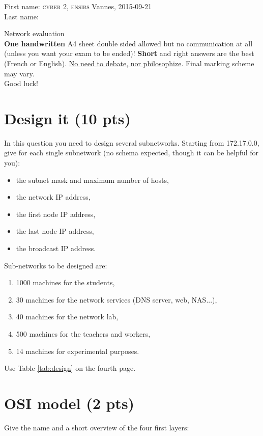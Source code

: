 \documentclass[11pt]{article}
\begin{document}
\noindent First name: \hfill {\scshape cyber} 2, {\scshape ensibs} Vannes, 2015-09-21 \\
Last name:
\begin{center}
	{\LARGE{Network evaluation}} \\ \vspace{10pt}
	\textbf{One handwritten} A4 sheet double sided allowed but no communication at all (unless you want your exam to be ended)!
	\textbf{Short} and right answers are the best (French or English). \underline{No need to debate, nor philosophize}. Final marking scheme may vary. \\
	Good luck!
\end{center}

\section{Design it (10 pts)}
	In this question you need to design several subnetworks. Starting from 172.17.0.0, give for each single subnetwork (no schema expected, though it can be helpful for you):
	\begin{itemize}
		\item the subnet mask and maximum number of hosts,
		\item the network IP address,
		\item the first node IP address,
		\item the last node IP address,
		\item the broadcast IP address.
	\end{itemize}
	Sub-networks to be designed are:
	\begin{enumerate}
		\item 1000 machines for the students,
		\item 30 machines for the network services (DNS server, web, NAS...),
		\item 40 machines for the network lab,
		\item 500 machines for the teachers and workers,
		\item 14 machines for experimental purposes.
	\end{enumerate}
Use Table \ref{tab:design} on the fourth page.

\section{OSI model (2 pts)}
	Give the name and a short overview of the four first layers:%
\pagebreak
\end{document}
